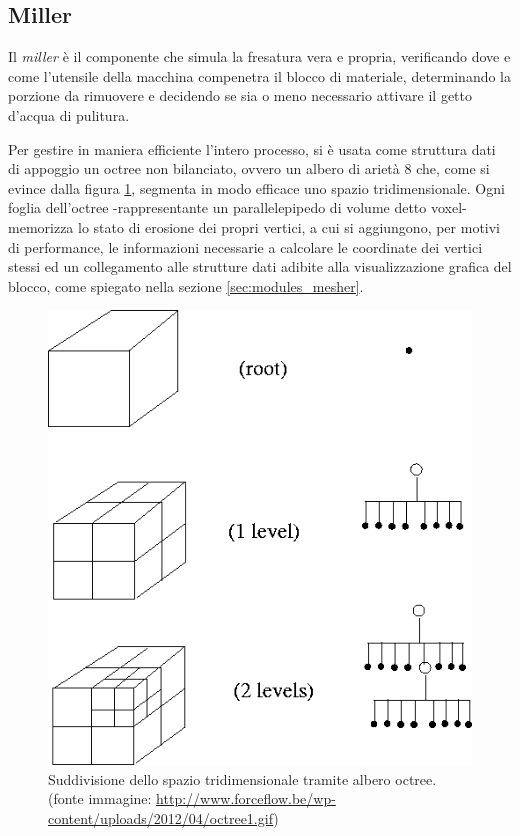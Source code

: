 \subsection{Miller}
Il \emph{miller} è il componente che simula la fresatura vera e propria, verificando dove e come l'utensile della macchina compenetra il blocco di materiale, determinando la porzione da rimuovere e decidendo se sia o meno necessario attivare il getto d'acqua di pulitura.

Per gestire in maniera efficiente l'intero processo, si è usata come struttura dati di appoggio un octree non bilanciato, ovvero un albero di arietà 8 che, come si evince dalla figura \ref{fig:octree_explanation}, segmenta in modo efficace uno spazio tridimensionale. Ogni foglia dell'octree -rappresentante un parallelepipedo di volume detto voxel- memorizza lo stato di erosione dei propri vertici, a cui si aggiungono, per motivi di performance, le informazioni necessarie a calcolare le coordinate dei vertici stessi ed un collegamento alle strutture dati adibite alla visualizzazione grafica del blocco, come spiegato nella sezione \ref{sec:modules_mesher}.
\begin{figure}[htp]
	\centering
	\includegraphics[width=.75\textwidth]{img/octree_explanation}
	\caption{Suddivisione dello spazio tridimensionale tramite albero octree. {\footnotesize (fonte immagine: \url{http://www.forceflow.be/wp-content/uploads/2012/04/octree1.gif})}}
	\label{fig:octree_explanation}
\end{figure}

